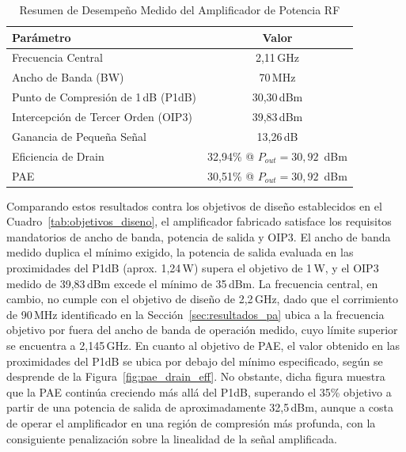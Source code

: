\begin{table}[H]
    \centering
    \caption{Resumen de Desempeño Medido del Amplificador de Potencia RF}
    \label{tab:resumen_resultados}
    \begin{tabular}{lc}
        \hline\hline
        \textbf{Parámetro} & \textbf{Valor} \\
        \hline
        Frecuencia Central & 2,11\,GHz \\
        \hline
        Ancho de Banda (BW) & 70\,MHz \\
        \hline
        Punto de Compresión de 1\,dB (P1dB) & 30,30\,dBm \\
        \hline
        Intercepción de Tercer Orden (OIP3) & 39,83\,dBm \\
        \hline
        Ganancia de Pequeña Señal & 13,26\,dB \\
        \hline
        Eficiencia de Drain & 32,94\% @ $P_{out} = 30{,}92\,$ dBm \\
        \hline
        PAE & 30,51\% @ $P_{out} = 30{,}92\,$ dBm \\
        \hline\hline
    \end{tabular}
\end{table}

Comparando estos resultados contra los objetivos de diseño establecidos en el Cuadro~\ref{tab:objetivos_diseno}, el amplificador fabricado satisface los requisitos mandatorios de ancho de banda, potencia de salida y OIP3. El ancho de banda medido duplica el mínimo exigido, la potencia de salida evaluada en las proximidades del P1dB (aprox. 1,24\,W) supera el objetivo de 1\,W, y el OIP3 medido de 39,83\,dBm excede el mínimo de 35\,dBm. La frecuencia central, en cambio, no cumple con el objetivo de diseño de 2,2\,GHz, dado que el corrimiento de 90\,MHz identificado en la Sección~\ref{sec:resultados_pa} ubica a la frecuencia objetivo por fuera del ancho de banda de operación medido, cuyo límite superior se encuentra a 2,145\,GHz. En cuanto al objetivo de PAE, el valor obtenido en las proximidades del P1dB se ubica por debajo del mínimo especificado, según se desprende de la Figura~\ref{fig:pae_drain_eff}. No obstante, dicha figura muestra que la PAE continúa creciendo más allá del P1dB, superando el 35\% objetivo a partir de una potencia de salida de aproximadamente 32,5\,dBm, aunque a costa de operar el amplificador en una región de compresión más profunda, con la consiguiente penalización sobre la linealidad de la señal amplificada.

